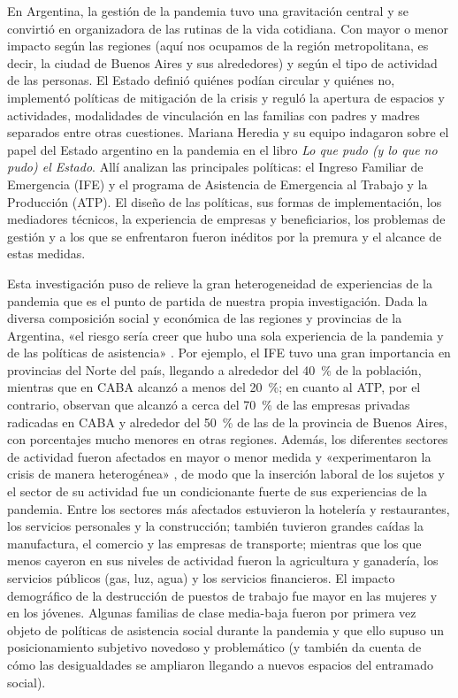 \begin{refsection}
En Argentina, la gestión de la pandemia tuvo una gravitación central y se convirtió en organizadora de las rutinas de la vida cotidiana. Con mayor o menor impacto según las regiones (aquí nos ocupamos de la región metropolitana, es decir, la ciudad de Buenos Aires y sus alrededores) y según el tipo de actividad de las personas. El Estado definió quiénes podían circular y quiénes no, implementó políticas de mitigación de la crisis y reguló la apertura de espacios y actividades, modalidades de vinculación en las familias con padres y madres separados entre otras cuestiones. Mariana Heredia y su equipo indagaron sobre el papel del Estado argentino en la pandemia en el libro \emph{Lo que pudo (y lo que no pudo) el Estado}. Allí analizan las principales políticas: el Ingreso Familiar de Emergencia (IFE) y el programa de Asistencia de Emergencia al Trabajo y la Producción (ATP). El diseño de las políticas, sus formas de implementación, los mediadores técnicos, la experiencia de empresas y beneficiarios, los problemas de gestión y a los que se enfrentaron fueron inéditos por la premura y el alcance de estas medidas.

Esta investigación puso de relieve la gran heterogeneidad de experiencias de la pandemia que es el punto de partida de nuestra propia investigación. Dada la diversa composición social y económica de las regiones y provincias de la Argentina, «el riesgo sería creer que hubo una sola experiencia de la pandemia y de las políticas de asistencia» \protect\parencite[pág.~15]{4182-HEREDIA2022}. Por ejemplo, el IFE tuvo una gran importancia en provincias del Norte del país, llegando a alrededor del \SI{40}{\percent} de la población, mientras que en CABA alcanzó a menos del \SI{20}{\percent}; en cuanto al ATP, por el contrario, observan que alcanzó a cerca del \SI{70}{\percent} de las empresas privadas radicadas en CABA y alrededor del \SI{50}{\percent} de las de la provincia de Buenos Aires, con porcentajes mucho menores en otras regiones. Además, los diferentes sectores de actividad fueron afectados en mayor o menor medida y «experimentaron la crisis de manera heterogénea» \protect\parencite[pág.~172]{4178-ALVAREZ2022}, de modo que la inserción laboral de los sujetos y el sector de su actividad fue un condicionante fuerte de sus experiencias de la pandemia. Entre los sectores más afectados estuvieron la hotelería y restaurantes, los servicios personales y la construcción; también tuvieron grandes caídas la manufactura, el comercio y las empresas de transporte; mientras que los que menos cayeron en sus niveles de actividad fueron la agricultura y ganadería, los servicios públicos (gas, luz, agua) y los servicios financieros. El impacto demográfico de la destrucción de puestos de trabajo fue mayor en las mujeres y en los jóvenes. Algunas familias de clase media-baja fueron por primera vez objeto de políticas de asistencia social durante la pandemia y que ello supuso un posicionamiento subjetivo novedoso y problemático (y también da cuenta de cómo las desigualdades se ampliaron llegando a nuevos espacios del entramado social).


\end{refsection}
